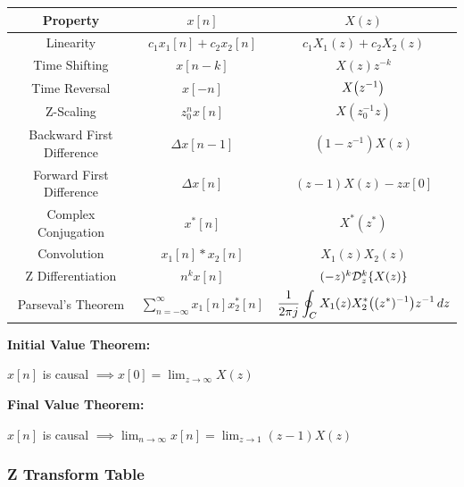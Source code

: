 \documentclass[11pt]{article}
\begin{document}
  \bgroup
  \renewcommand{\arraystretch}{2.1}
  \setlength{\tabcolsep}{0.7cm}
  \large\begin{tabular}{c|c|c}
    Property & \(x[n]\) & \(X(z)\) \\
    \hline
    Linearity & \(c_1x_1[n] + c_2x_2[n]\) & \(c_1X_1(z) + c_2X_2(z)\) \\
    Time Shifting & \(x[n - k]\) & \(X(z)z^{-k}\) \\
    Time Reversal & \(x[-n]\) & \(X{\left( z^{-1} \right)}\) \\
    Z-Scaling & \(z_0^nx[n]\) & \(X(z_0^{-1}z)\) \\
    Backward First Difference & \(\Delta x[n - 1]\) & \((1 - z^{-1})X(z)\) \\
    Forward First Difference & \(\Delta x[n]\) & \((z - 1)X(z) - zx[0]\) \\
    Complex Conjugation & \(x^*[n]\) & \(X^*(z^*)\) \\
    Convolution & \(x_1[n] * x_2[n]\) & \(X_1(z)X_2(z)\) \\
    Z Differentiation & \(n^kx[n]\) & \((-z)^k \mathcal{D}_z^k{\left\{ X(z) \right\}}\) \\
    Parseval's Theorem & \(\displaystyle\sum_{n = -\infty}^\infty x_1[n]x_2^*[n]\) &
    \(\displaystyle \dfrac{1}{2\pi j} \oint_C X_1(z)X_2^*{\left( (z^*)^{-1} \right)}z^{-1}\, dz\) \\
  \end{tabular}

  \textbf{Initial Value Theorem:}

  \(x[n]\) is causal \(\implies x[0] = \displaystyle \lim_{z \to \infty} X(z)\)

  \textbf{Final Value Theorem:}

  \(x[n]\) is causal \(\implies \displaystyle \lim_{n \to \infty} x[n] =\lim_{z \to 1} (z - 1)X(z)\)

  \pagebreak

  \subsubsection{Z Transform Table}
\end{document}
